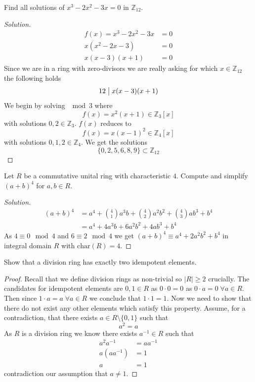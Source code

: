 \begin{prob}
    Find all solutions of $x^3 - 2x^2 -3x = 0$ in $\mathbb Z_{12}$.
\end{prob}
\begin{proof}[Solution]
    \begin{align*}
        f(x) = x^3 - 2x^2 - 3x &= 0 \\ 
        x(x^2 - 2x - 3) &= 0 \\ 
        x(x-3)(x+1)     &= 0 
    \end{align*}
    Since we are in a ring with zero-divisors we are really asking 
    for which $x \in \mathbb Z_{12}$ the following holds 
    \[
        12 \bigm| x(x-3)(x+1)
    \]
    We begin by solving $\mod 3$ where 
    \[
        f(x) = x^2(x+1) \in \mathbb Z_3[x]
    \]
    with solutions $0,2 \in \mathbb Z_3$. $f(x)$ reduces to 
    \[
        f(x) = x(x-1)^2 \in \mathbb Z_4[x]
    \]
    with solutions $0,1,2 \in \mathbb Z_4$. 
    We get the solutions 
    \[
        \{0,2,5,6,8,9\} \subset \mathbb Z_{12}
    \]
\end{proof}
\begin{prob}
    Let $R$ be a commutative unital ring with characteristic 
    $4$. Compute and simplify $(a+b)^4$ for $a,b \in R$. 
\end{prob}
\begin{proof}[Solution]
    \begin{align*}
        (a+b)^4 &= a^4 + \binom{4}{1}a^3b + \binom{4}{2}a^2b^2 + 
        \binom{4}{3}ab^3 + b^4 \\ 
                &= a^4 + 4a^3b + 6a^2b^2 + 4ab^3 + b^4
    \end{align*} 
    As $4 \equiv 0 \mod 4$ and $6 \equiv 2 \mod 4$ we get 
    $(a+b)^4 \equiv a^4 + 2a^2b^2 + b^4$ in integral domain $R$ 
    with $\text{char}(R) = 4$. 
\end{proof}
\begin{prob}
    Show that a division ring has exactly two idempotent elements. 
\end{prob}
\begin{proof}
    Recall that we define division rings as non-trivial so 
    $|R| \geq 2$ crucially. The candidates for idempotent elements 
    are $0,1 \in R$ as $0 \cdot 0 = 0$ as $0\cdot a = 0 \; 
    \forall a \in R$. Then since $1 \cdot a = a \; \forall a \in R$ 
    we conclude that $1 \cdot 1 = 1$. Now we need to show that 
    there do not exist any other elements which satisfy this 
    property. Assume, for a contradiction, that there exists 
    $a \in R \setminus \{0,1\}$ such that 
    \[
        a^2 = a
    \]
    As $R$ is a division ring we know there exists $a^{-1} \in R$ 
    such that 
    \begin{align*}
        a^2a^{-1} &= aa^{-1} \\ 
        a(aa^{-1}) &= 1 \\ 
        a &= 1
    \end{align*}
    contradiction our assumption that $a \neq 1$. 
\end{proof}
